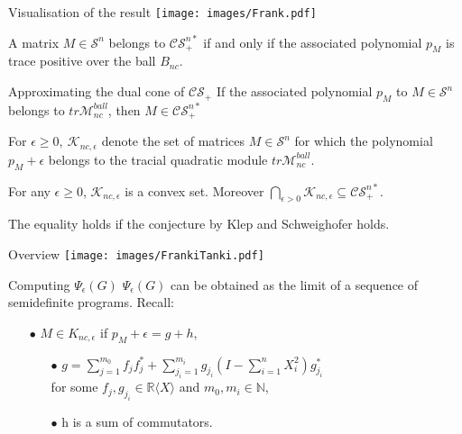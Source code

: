 \documentclass[13.5pt]{beamer}
\begin{document}
\begin{frame}{Visualisation of the result}
\texttt{[image: images/Frank.pdf]}

\begin{lemma}
A matrix $M \in \mathcal{S}^n$ belongs to $\mathcal{CS}_+^{n*}$ if and only if the associated polynomial $p_M$ is trace positive over the ball $B_{nc}$.
\end{lemma}
\end{frame}

\begin{frame}{Approximating the dual cone of $\mathcal{CS}_+$}
If the associated polynomial $p_M$ to $M \in \mathcal{S}^n$ belongs to $tr \mathcal{M}_{nc}^{ball}$, then $M \in \mathcal{CS}_+^{n*}$
\begin{definition}
For $\epsilon \geq 0,~\mathcal{K}_{nc,\epsilon}$ denote the set of matrices $M \in \mathcal{S}^n$ for which the polynomial $p_M + \epsilon$ belongs to the tracial quadratic module $tr\mathcal{M}_{nc}^{ball}$.
\end{definition}
\pause
\begin{lemma}
For any $\epsilon \geq 0$, $\mathcal{K}_{nc,\epsilon }$ is a convex set. Moreover $ \bigcap \limits_{\epsilon > 0} 
\mathcal{K}_{nc,\epsilon} \subseteq \mathcal{CS}_+^{n*}$.
\end{lemma}
The equality holds if the conjecture by Klep and Schweighofer holds.
\end{frame}

\begin{frame}{Overview}
\texttt{[image: images/FrankiTanki.pdf]}
\end{frame}

\begin{frame}{Computing $\Psi_{\epsilon}(G)$}
$\Psi_{\epsilon}(G)$ can be obtained as the limit of a sequence of semidefinite programs.
\pause
Recall:
\begin{itemize}
\item[$\bullet$] $M \in K_{nc,\epsilon}$ if $p_M + \epsilon = g+h$,
\begin{itemize}
\item[$\bullet$] $g= \sum_{j=1}^{m_0} f_j f_j^* +  \sum_{j_i=1}^{m_i} g_{j_i} (I- \sum_{i=1}^n X_i^2) g_{j_i}^*$ \\ \vspace*{2mm} for some $f_j,g_{j_i} \in \mathbb{R}\langle X \rangle $ and $m_0,m_i \in \mathbb{N}$,
\item[$\bullet$] h is a sum of commutators.
\end{itemize}
\end{itemize}
\end{frame}
\end{document}
